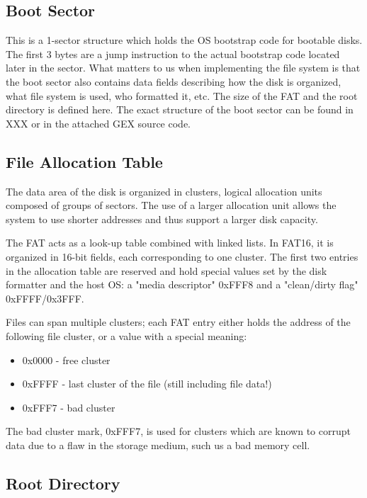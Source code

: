 \subsection{Boot Sector}

This is a 1-sector structure which holds the OS bootstrap code for bootable disks. The first 3 bytes are a jump instruction to the actual bootstrap code located later in the sector. What matters to us when implementing the file system is that the boot sector also contains data fields describing how the disk is organized, what file system is used, who formatted it, etc. The size of the FAT and the root directory is defined here. The exact structure of the boot sector can be found in XXX or in the attached GEX source code.

\subsection{File Allocation Table}

The data area of the disk is organized in clusters, logical allocation units composed of groups of sectors. The use of a larger allocation unit allows the system to use shorter addresses and thus support a larger disk capacity.

The FAT acts as a look-up table combined with linked lists. In FAT16, it is organized in 16-bit fields, each corresponding to one cluster. The first two entries in the allocation table are reserved and hold special values set by the disk formatter and the host OS: a "media descriptor" 0xFFF8 and a "clean/dirty flag" 0xFFFF/0x3FFF. 

Files can span multiple clusters; each FAT entry either holds the address of the following file cluster, or a value with a special meaning:

\begin{itemize}
	\item 0x0000 - free cluster
	\item 0xFFFF - last cluster of the file (still including file data!)
	\item 0xFFF7 - bad cluster
\end{itemize}

The bad cluster mark, 0xFFF7, is used for clusters which are known to corrupt data due to a flaw in the storage medium, such us a bad memory cell.

\subsection{Root Directory}

